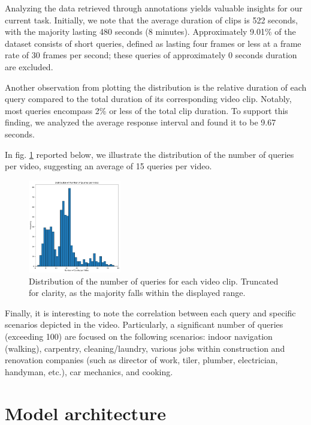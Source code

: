 \documentclass[10pt,twocolumn,letterpaper]{article}
\begin{document}
Analyzing the data retrieved through annotations yields valuable insights for our current task. Initially, we note that the average duration of clips is 522 seconds, with the majority lasting 480 seconds (8 minutes). Approximately 9.01\% of the dataset consists of short queries, defined as lasting four frames or less at a frame rate of 30 frames per second; these queries of approximately 0 seconds duration are excluded.

Another observation from plotting the distribution is the relative duration of each query compared to the total duration of its corresponding video clip. Notably, most queries encompass 2\% or less of the total clip duration. To support this finding, we analyzed the average response interval and found it to be 9.67 seconds.

In fig. \ref{fig:figure2} reported below, we illustrate the distribution of the number of queries per video, suggesting an average of 15 queries per video.

\begin{figure}[h]
\centering
\includegraphics[width=0.36\textwidth]{Figure2.pdf} %
\caption{Distribution of the number of queries for each video clip. Truncated for clarity, as the majority falls within the displayed range.}
\label{fig:figure2}
\end{figure}

Finally, it is interesting to note the correlation between each query and specific scenarios depicted in the video. Particularly, a significant number of queries (exceeding 100) are focused on the following scenarios: indoor navigation (walking), carpentry, cleaning/laundry, various jobs within construction and renovation companies (such as director of work, tiler, plumber, electrician, handyman, etc.), car mechanics, and cooking.


\section{Model architecture}
\label{sec:vslnet}
\end{document}
